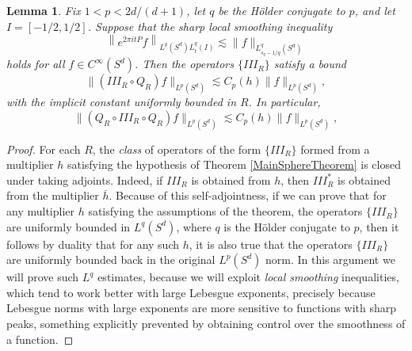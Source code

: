 \documentclass[dvipsnames,letterpaper,12pt]{article}
\newtheorem{lemma}[theorem]{Lemma}
\begin{document}
\begin{lemma} \label{LocalSmoothingLargeTimesTheorem}
    Fix $1 < p < 2d/(d+1)$, let $q$ be the H\"{o}lder conjugate to $p$, and let $I = [-1/2, 1/2]$. Suppose that the sharp local smoothing inequality
    \[ \left\| e^{2 \pi i t P} f \right\|_{L^q(S^d) L^q_t(I)} \lesssim \| f \|_{L^q_{s_q-1/q}(S^d)} \]
    holds for all $f \in C^\infty(S^d)$. Then the operators $\{ III_R \}$ satisfy a bound
    \[ \| (III_R \circ Q_R) f \|_{L^p(S^d)} \lesssim C_p(h) \| f \|_{L^p(S^d)}, \]
    with the implicit constant uniformly bounded in $R$. In particular,
    \[ \| (Q_R \circ III_R \circ Q_R) f \|_{L^p(S^d)} \lesssim C_p(h) \| f \|_{L^p(S^d)}, \]
\end{lemma}
\begin{proof}
    For each $R$, the \emph{class} of operators of the form $\{ III_R \}$ formed from a multiplier $h$ satisfying the hypothesis of Theorem \ref{MainSphereTheorem} is closed under taking adjoints. Indeed, if $III_R$ is obtained from $h$, then $III_R^*$ is obtained from the multiplier $\overline{h}$. Because of this self-adjointness, if we can prove that for any multiplier $h$ satisfying the assumptions of the theorem, the operators $\{ III_R \}$ are uniformly bounded in $L^q(S^d)$, where $q$ is the H\"{o}lder conjugate to $p$, then it follows by duality that for any such $h$, it is also true that the operators $\{ III_R \}$ are uniformly bounded back in the original $L^p(S^d)$ norm. In this argument we will prove such $L^q$ estimates, because we will exploit \emph{local smoothing} inequalities, which tend to work better with large Lebesgue exponents, precisely because Lebesgue norms with large exponents are more sensitive to functions with sharp peaks, something explicitly prevented by obtaining control over the smoothness of a function.


\end{proof}
\end{document}
